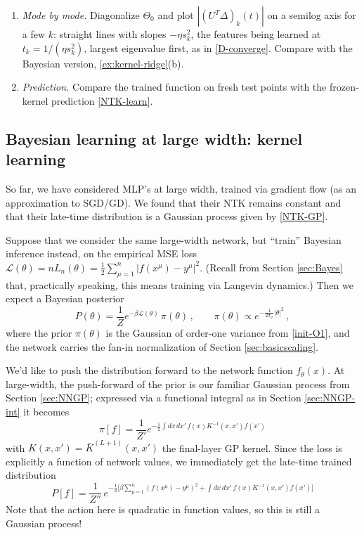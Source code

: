 \documentclass[11pt]{article}
\newcommand{\CL}{{\mathcal L}}
\begin{document}
\begin{exercise}
\begin{enumerate}
    \item \emph{Mode by mode.} Diagonalize $\Theta_0$ and plot $|(U^T\Delta)_k(t)|$ on a semilog axis for a few $k$: straight lines with slopes $-\eta s_k^2$, the features being learned at $t_k = 1/(\eta s_k^2)$, largest eigenvalue first, as in \eqref{D-converge}. Compare with the Bayesian version, \cref{ex:kernel-ridge}(b).
    \item \emph{Prediction.} Compare the trained function on fresh test points with the frozen-kernel prediction \eqref{NTK-learn}.
\end{enumerate}
\end{exercise}




\subsection{Bayesian learning at large width: kernel learning}
\label{sec:Bayes-kernel}

So far, we have considered MLP's at large width, trained via gradient flow (as an approximation to SGD/GD). We found that their NTK remains constant and that their late-time distribution is a Gaussian process given by \eqref{NTK-GP}.

Suppose that we consider the same large-width network, but ``train'' Bayesian inference instead, on the empirical MSE loss $\CL(\theta) = n L_n(\theta) = \frac{1}{2}\sum_{\mu=1}^n |f(x^\mu)-y^\mu|^2 $. (Recall from Section \ref{sec:Bayes} that, practically speaking, this means training via Langevin dynamics.) Then we expect a Bayesian posterior
%
\begin{equation}
    P(\theta) = \frac{1}{Z}e^{-\beta \CL(\theta)}\, \pi(\theta)\,,\qquad \pi(\theta) \propto e^{\textstyle-\frac{1}{2\sigma_w}|\theta|^2}\,,
\end{equation}
%
where the prior $\pi(\theta)$ is the Gaussian of order-one variance from \eqref{init-O1}, and the network carries the fan-in normalization of Section \ref{sec:basicscaling}.

We'd like to push the distribution forward to the network function $f_\theta(x)$. At large-width, the push-forward of the prior is our familiar Gaussian process from Section \ref{sec:NNGP}; expressed via a functional integral as in Section \ref{sec:NNGP-int} it becomes
%
\begin{equation} \pi[f] = \frac{1}{Z'} e^{\textstyle -\frac{1}{2}\int dx\,dx'\, f(x)  K^{-1}(x,x')f(x')}
\end{equation}
%
with $K(x,x')=\bar K^{(L+1)}(x,x')$ the final-layer GP kernel.
Since the loss is explicitly a function of network values, we immediately get the late-time trained distribution
%
\begin{equation}
    P[f] = \frac{1}{Z''}\,e^{\textstyle -\frac{1}{2}\Big[\beta \sum_{\mu=1}^n(f(x^\mu)-y^\mu)^2 + \int dx\,dx'\, f(x)  K^{-1}(x,x')f(x') \Big] } 
\end{equation}
%
Note that the action here is quadratic in function values, so this is still a Gaussian process!
\end{document}
